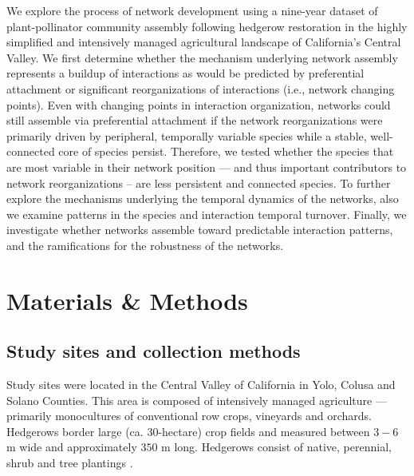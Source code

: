 \documentclass[12pt]{article}
\begin{document}
We explore the process of network development using a nine-year
dataset of plant-pollinator community assembly following hedgerow
restoration in the highly simplified and intensively managed
agricultural landscape of California’s Central Valley. We first
determine whether the mechanism underlying network assembly represents
a buildup of interactions as would be predicted by preferential
attachment or significant reorganizations of interactions (i.e.,
network changing points). Even with changing points in interaction
organization, networks could still assemble via preferential
attachment if the network reorganizations were primarily driven by
peripheral, temporally variable species while a stable, well-connected
core of species persist. Therefore, we tested whether the species that
are most variable in their network position --- and thus important
contributors to network reorganizations -- are less persistent and
connected species. To further explore the mechanisms underlying the
temporal dynamics of the networks, also we examine patterns in the
species and interaction temporal turnover. Finally, we investigate
whether networks assemble toward predictable interaction patterns, and
the ramifications for the robustness of the networks.


\section*{Materials \& Methods}
\label{sec:methods}

\subsection*{Study sites and collection methods}
\label{sec:study-sites}

Study sites were located in the Central Valley of California in Yolo,
Colusa and Solano Counties. This area is composed of intensively
managed agriculture --- primarily monocultures of conventional row
crops, vineyards and orchards. Hedgerows border large
(ca. $30$-hectare) crop fields and measured between $3-6$ m wide and
approximately $350$ m long. Hedgerows consist of native, perennial,
shrub and tree plantings \citep[Fig.~S1, ][]{menz-2010-4,
  kremen-2015-602, mgonigle-2015-x}.
\end{document}
